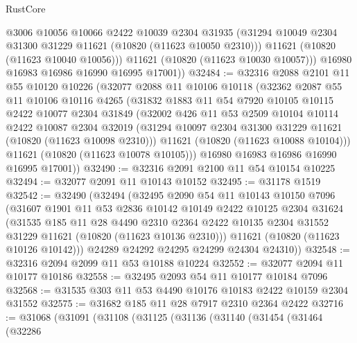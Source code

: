 \begin{lexlean}{RustCore}
\begin{coremodule}
            @3006
            @10056
            @10066
            @2422
            @10039
            @2304
            @31935
            (@31294 @10049 @2304 @31300 @31229 @11621 (@10820 (@11623 @10050 @2310)))
            @11621
            (@10820 (@11623 @10040 @10056)))
          @11621
          (@10820 (@11623 @10030 @10057)))
        @16980
        @16983
        @16986
        @16990
        @16995
        @17001))
@32484 := @32316
    @2088
    @2101
    @11
    @55
    @10120
    @10226
    (@32077
      @2088
      @11
      @10106
      @10118
      (@32362
        @2087
        @55
        @11
        @10106
        @10116
        @4265
        (@31832
          @1883
          @11
          @54
          @7920
          @10105
          @10115
          @2422
          @10077
          @2304
          @31849
          (@32002
            @426
            @11
            @53
            @2509
            @10104
            @10114
            @2422
            @10087
            @2304
            @32019
            (@31294 @10097 @2304 @31300 @31229 @11621 (@10820 (@11623 @10098 @2310)))
            @11621
            (@10820 (@11623 @10088 @10104)))
          @11621
          (@10820 (@11623 @10078 @10105)))
        @16980
        @16983
        @16986
        @16990
        @16995
        @17001))
@32490 := @32316 @2091 @2100 @11 @54 @10154 @10225
@32494 := @32077 @2091 @11 @10143 @10152
@32495 := @31178 @1519
@32542 := @32490
    (@32494
      (@32495
        @2090
        @54
        @11
        @10143
        @10150
        @7096
        (@31607
          @1901
          @11
          @53
          @2836
          @10142
          @10149
          @2422
          @10125
          @2304
          @31624
          (@31535
            @185
            @11
            @28
            @4490
            @2310
            @2364
            @2422
            @10135
            @2304
            @31552
            @31229
            @11621
            (@10820 (@11623 @10136 @2310)))
          @11621
          (@10820 (@11623 @10126 @10142)))
        @24289
        @24292
        @24295
        @24299
        @24304
        @24310))
@32548 := @32316 @2094 @2099 @11 @53 @10188 @10224
@32552 := @32077 @2094 @11 @10177 @10186
@32558 := @32495 @2093 @54 @11 @10177 @10184 @7096
@32568 := @31535 @303 @11 @53 @4490 @10176 @10183 @2422 @10159 @2304 @31552
@32575 := @31682 @185 @11 @28 @7917 @2310 @2364 @2422
@32716 := @31068
    (@31091
      (@31108
        (@31125
          (@31136
            (@31140
              (@31454
                (@31464
                  (@32286

\end{coremodule}
\end{lexlean}

